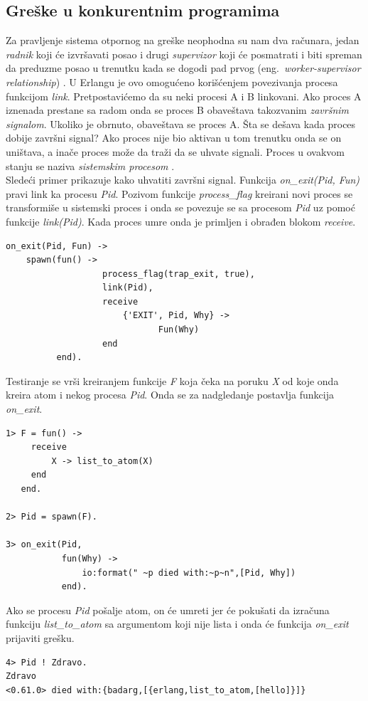 \documentclass[a4paper]{article}
\begin{document}
{\subsection{Greške u konkurentnim programima}
Za pravljenje sistema otpornog na greške neophodna su nam dva računara, 
jedan {\em radnik} koji će izvršavati posao i drugi {\em supervizor} 
koji će posmatrati i biti spreman da preduzme posao u trenutku kada se dogodi pad prvog  (eng.~{\em worker-supervisor relationship}) \cite{book_joe}. 
U Erlangu je ovo omogućeno korišćenjem povezivanja procesa funkcijom {\em link}. 
Pretpostavićemo da su neki procesi A i B  linkovani. 
Ako proces A iznenada prestane sa radom onda se proces B obaveštava takozvanim {\em završnim signalom}. 
Ukoliko je obrnuto, obaveštava se proces A. 
Šta se dešava kada proces dobije završni signal? 
Ako proces nije bio aktivan u tom trenutku onda se on uništava, 
a inače proces može da traži da se uhvate signali. Proces u ovakvom stanju se naziva {\em sistemskim procesom} \cite{book_joe}. \\

Sledeći primer prikazuje kako uhvatiti završni signal.
Funkcija {\em on\_exit(Pid, Fun) } pravi link ka procesu {\em Pid}. 
Pozivom funkcije {\em process\_flag} kreirani novi proces se transformiše u sistemski proces i onda se povezuje se sa procesom {\em Pid} uz pomoć funkcije {\em link(Pid)}. 
Kada proces umre onda je primljen i obrađen blokom {\em receive}.
\begin{verbatim} 
on_exit(Pid, Fun) ->	
    spawn(fun() ->    
                   process_flag(trap_exit, true),
                   link(Pid),
                   receive
                       {'EXIT', Pid, Why} ->
                              Fun(Why)
                   end
          end).
\end{verbatim}

Testiranje se vrši kreiranjem funkcije {\em F} 
koja čeka na poruku {\em X} od koje onda kreira atom i nekog procesa {\em Pid}. 
Onda se za nadgledanje postavlja funkcija {\em on\_exit}.
\begin{verbatim} 
1> F = fun() ->
     receive
         X -> list_to_atom(X)
     end
   end.

2> Pid = spawn(F).

3> on_exit(Pid,
           fun(Why) ->
               io:format(" ~p died with:~p~n",[Pid, Why])
           end).

\end{verbatim}

Ako se procesu {\em Pid} pošalje atom, on će umreti jer će pokušati da izračuna funkciju {\em list\_to\_atom} 
sa argumentom koji nije lista i onda će funkcija {\em on\_exit} prijaviti grešku.
\begin{verbatim} 
4> Pid ! Zdravo.
Zdravo
<0.61.0> died with:{badarg,[{erlang,list_to_atom,[hello]}]}
\end{verbatim}

}
\end{document}
